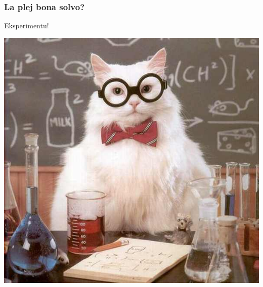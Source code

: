   \begin{frame}
    \frametitle{La plej bona solvo?}
    
    		\begin{center}
    		\begin{block}
    		
			\begin{huge}
				\begin{center}
				\alert{Eksperimentu}!
				\end{center}
			\end{huge} 
    		\end{block}

			\vspace{1em}    		
    		
    		\includegraphics[scale=0.35]{meme/eksperimento}
    		
    		\end{center}

  \end{frame}


